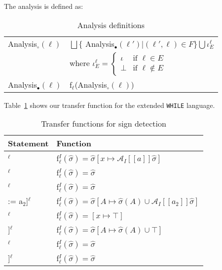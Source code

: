 \noindent The analysis is defined as:
\begin{table}[H]
\begin{tabular}{| l | l |}
  \hline
  Analysis$_\circ(\ell)$ & $ \bigsqcup \{$ Analysis$_\bullet (\ell') | (\ell', \ell) \in F \} \bigcup \iota_E^{\ell} $ \\
                         & where $\iota_E^{\ell} = \begin{cases} \iota & \text{if } \ell \in E \\ 
                                                                 \bot  & \text{if } \ell \notin E
                                                   \end{cases}$\\
  \hline
  Analysis$_\bullet(\ell)$ & f$_\ell$(Analysis$_\circ(\ell)$)\\
  \hline
\end{tabular}
\centering
\caption{Analysis definitions}
\end{table}

Table~\ref{table:interval_analysis_functions} shows our transfer function for the extended \texttt{WHILE} language.
\begin{table}[h]
\begin{tabular}{| l | l |}
  \hline
  Statement & Function \\
  \hline
  \hline
  [x := a]$^\ell$ & f$_\ell^I (\widehat{\sigma}) = \widehat{\sigma}[x \mapsto \mathcal{A}_I[\![a]\!] \widehat{\sigma} ]$ \\
  \hline
 [skip]$^\ell$ & f$_\ell^I (\widehat{\sigma}) = \widehat{\sigma}$\\
  \hline
 [b]$^\ell$ & f$_\ell^I (\widehat{\sigma}) = \widehat{\sigma}$\\
  \hline
  [A[a$_1$] := a$_2$]$^\ell$ & f$_\ell^I (\widehat{\sigma}) = \widehat{\sigma}[A\mapsto \widehat{\sigma}(A)\cup \mathcal{A}_I[\![a_2]\!] \widehat{\sigma}]$\\
  \hline
  [read x]$^\ell$ & f$_\ell^I (\widehat{\sigma}) = [x \mapsto \top]$ \\
  \hline
  [read A[a]]$^\ell$ & f$_\ell^I (\widehat{\sigma}) =  \widehat{\sigma}[A\mapsto \widehat{\sigma}(A)\cup \top]$\\
  \hline
  [write x]$^\ell$ & f$_\ell^I (\widehat{\sigma}) = \widehat{\sigma}$\\
  \hline
  [write A[n]]$^\ell$ & f$_\ell^I (\widehat{\sigma}) = \widehat{\sigma}$\\
  \hline
\end{tabular}
\centering
\caption{Transfer functions for sign detection}
\label{table:interval_analysis_functions}
\end{table}


